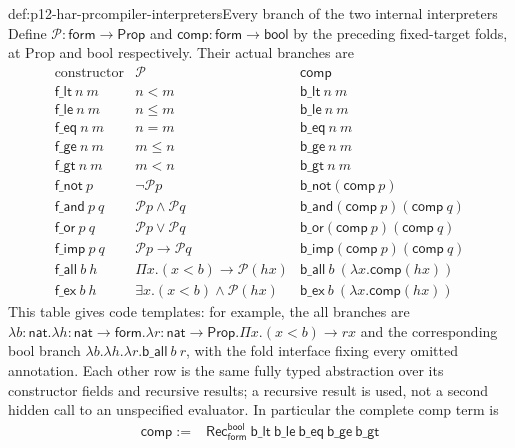 \begin{hbdefinition}{def:p12-har-prcompiler-interpreters}{Every branch of the two internal interpreters}
Define \(\mathcal P:\mathsf{form}\to\mathsf{Prop}\) and
\(\mathsf{comp}:\mathsf{form}\to\mathsf{bool}\) by the preceding
fixed-target folds, at Prop and bool respectively. Their actual branches are
\[
\begin{array}{c|c|c}
 \text{constructor}&\mathcal P&\mathsf{comp}\\\hline
 \mathsf{f\_lt}\ n\ m&n<m&\mathsf{b\_lt}\ n\ m\\
 \mathsf{f\_le}\ n\ m&n\le m&\mathsf{b\_le}\ n\ m\\
 \mathsf{f\_eq}\ n\ m&n=m&\mathsf{b\_eq}\ n\ m\\
 \mathsf{f\_ge}\ n\ m&m\le n&\mathsf{b\_ge}\ n\ m\\
 \mathsf{f\_gt}\ n\ m&m<n&\mathsf{b\_gt}\ n\ m\\
 \mathsf{f\_not}\ p&\neg\mathcal P p&\mathsf{b\_not}(\mathsf{comp}\ p)\\
 \mathsf{f\_and}\ p\ q&\mathcal P p\wedge\mathcal P q&
                   \mathsf{b\_and}(\mathsf{comp}\ p)(\mathsf{comp}\ q)\\
 \mathsf{f\_or}\ p\ q&\mathcal P p\vee\mathcal P q&
                   \mathsf{b\_or}(\mathsf{comp}\ p)(\mathsf{comp}\ q)\\
 \mathsf{f\_imp}\ p\ q&\mathcal P p\to\mathcal P q&
                   \mathsf{b\_imp}(\mathsf{comp}\ p)(\mathsf{comp}\ q)\\
 \mathsf{f\_all}\ b\ h&\Pi x.(x<b)\to\mathcal P(h x)&
                   \mathsf{b\_all}\ b\ (\lambda x.\mathsf{comp}(h x))\\
 \mathsf{f\_ex}\ b\ h&\exists x.(x<b)\wedge\mathcal P(h x)&
                   \mathsf{b\_ex}\ b\ (\lambda x.\mathsf{comp}(h x))
\end{array}
\]
This table gives code templates: for example, the all branches are
\(\lambda b:\mathsf{nat}.\lambda h:\mathsf{nat}\to\mathsf{form}.
\lambda r:\mathsf{nat}\to\mathsf{Prop}.\Pi x.(x<b)\to r x\)
and the corresponding bool branch
\(\lambda b.\lambda h.\lambda r.\mathsf{b\_all}\ b\ r\),
with the fold interface fixing every omitted annotation. Each other row
is the same fully typed abstraction over its constructor fields and
recursive results; a recursive result is used, not a second hidden call
to an unspecified evaluator. In particular the complete comp term is
\[
\begin{aligned}
 \mathsf{comp}:={}&\mathsf{Rec}_{\mathsf{form}}^{\mathsf{bool}}
  \ \mathsf{b\_lt}\ \mathsf{b\_le}\ \mathsf{b\_eq}\ \mathsf{b\_ge}\ \mathsf{b\_gt}\\

\end{aligned}\]
\end{hbdefinition}
